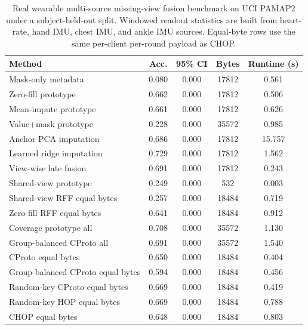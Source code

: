 \begin{table}[t]
\centering
\caption{Real wearable multi-source missing-view fusion benchmark on UCI PAMAP2 under a subject-held-out split. Windowed readout statistics are built from heart-rate, hand IMU, chest IMU, and ankle IMU sources. Equal-byte rows use the same per-client per-round payload as CHOP.}
\label{tab:if-pamap2-fusion}
\scriptsize
\setlength{\tabcolsep}{3pt}
\renewcommand{\arraystretch}{0.94}
\begin{tabular}{lcccc}
\toprule
Method & Acc. & 95\% CI & Bytes & Runtime (s) \\
\midrule
Mask-only metadata & 0.080 & 0.000 & 17812 & 0.561 \\
Zero-fill prototype & 0.662 & 0.000 & 17812 & 0.506 \\
Mean-impute prototype & 0.661 & 0.000 & 17812 & 0.626 \\
Value+mask prototype & 0.228 & 0.000 & 35572 & 0.985 \\
Anchor PCA imputation & 0.686 & 0.000 & 17812 & 15.757 \\
Learned ridge imputation & 0.729 & 0.000 & 17812 & 1.562 \\
View-wise late fusion & 0.691 & 0.000 & 17812 & 0.243 \\
Shared-view prototype & 0.249 & 0.000 & 532 & 0.003 \\
Shared-view RFF equal bytes & 0.257 & 0.000 & 18484 & 0.719 \\
Zero-fill RFF equal bytes & 0.641 & 0.000 & 18484 & 0.912 \\
Coverage prototype all & 0.708 & 0.000 & 35572 & 1.130 \\
Group-balanced CProto all & 0.691 & 0.000 & 35572 & 1.540 \\
CProto equal bytes & 0.650 & 0.000 & 18484 & 0.404 \\
Group-balanced CProto equal bytes & 0.594 & 0.000 & 18484 & 0.456 \\
Random-key CProto equal bytes & 0.669 & 0.000 & 18484 & 0.419 \\
Random-key HOP equal bytes & 0.669 & 0.000 & 18484 & 0.788 \\
CHOP equal bytes & 0.648 & 0.000 & 18484 & 0.803 \\
\bottomrule
\end{tabular}
\end{table}
